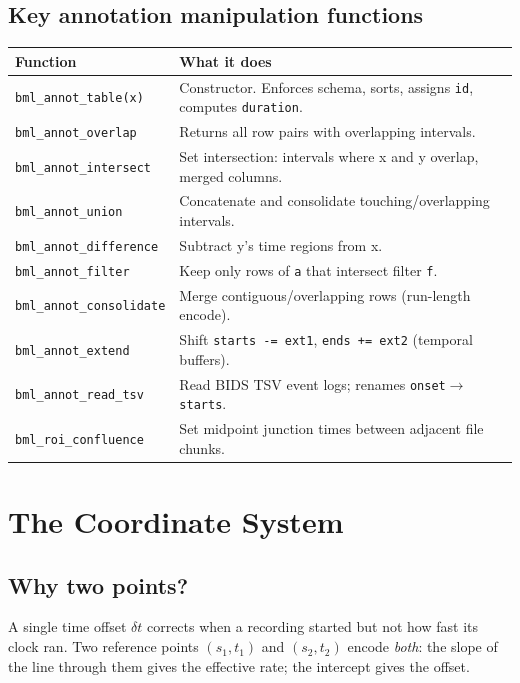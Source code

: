 \documentclass[11pt, a4paper]{article}
\begin{document}
\subsection{Key annotation manipulation functions}

\begin{longtable}{L{4cm} L{10cm}}
\toprule \textbf{Function} & \textbf{What it does} \\ \midrule \endhead
\texttt{bml\_annot\_table(x)} & Constructor. Enforces schema, sorts, assigns \texttt{id}, computes \texttt{duration}. \\[2pt]
\texttt{bml\_annot\_overlap} & Returns all row pairs with overlapping intervals. \\[2pt]
\texttt{bml\_annot\_intersect} & Set intersection: intervals where x and y overlap, merged columns. \\[2pt]
\texttt{bml\_annot\_union} & Concatenate and consolidate touching/overlapping intervals. \\[2pt]
\texttt{bml\_annot\_difference} & Subtract y's time regions from x. \\[2pt]
\texttt{bml\_annot\_filter} & Keep only rows of \texttt{a} that intersect filter \texttt{f}. \\[2pt]
\texttt{bml\_annot\_consolidate} & Merge contiguous/overlapping rows (run-length encode). \\[2pt]
\texttt{bml\_annot\_extend} & Shift \texttt{starts -= ext1}, \texttt{ends += ext2} (temporal buffers). \\[2pt]
\texttt{bml\_annot\_read\_tsv} & Read BIDS TSV event logs; renames \texttt{onset}$\to$\texttt{starts}. \\[2pt]
\texttt{bml\_roi\_confluence} & Set midpoint junction times between adjacent file chunks. \\
\bottomrule
\end{longtable}

\section{The Coordinate System}
\label{sec:coords}

\subsection{Why two points?}

A single time offset $\delta t$ corrects when a recording started but not how fast its clock ran. Two reference points $(s_1, t_1)$ and $(s_2, t_2)$ encode \emph{both}: the slope of the line through them gives the effective rate; the intercept gives the offset.
\end{document}
